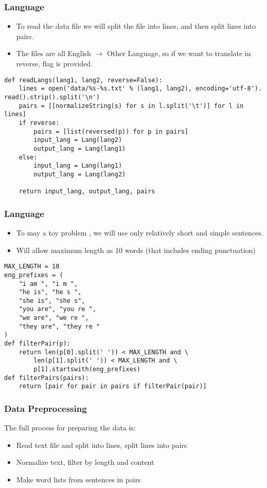 \begin{frame}[fragile]
\frametitle{ Language}
\begin{itemize}
\item To read the data file we will split the file into lines, and then split lines into pairs. 
\item The files are all English $\rightarrow$ Other Language, so if we want to translate in reverse, flag is provided.
\end{itemize}
\begin{lstlisting}    
def readLangs(lang1, lang2, reverse=False):
    lines = open('data/%s-%s.txt' % (lang1, lang2), encoding='utf-8'). read().strip().split('\n')
    pairs = [[normalizeString(s) for s in l.split('\t')] for l in lines]
    if reverse:
        pairs = [list(reversed(p)) for p in pairs]
        input_lang = Lang(lang2)
        output_lang = Lang(lang1)
    else:
        input_lang = Lang(lang1)
        output_lang = Lang(lang2)

    return input_lang, output_lang, pairs
\end{lstlisting}         
\end{frame} 

\begin{frame}[fragile]
\frametitle{ Language}
\begin{itemize}
\item To may a toy problem , we will use only relatively short and simple sentences. 
\item Will allow maximum length as 10 words (that includes ending punctuation) 
\end{itemize}
\begin{lstlisting}    
MAX_LENGTH = 10
eng_prefixes = (
    "i am ", "i m ",
    "he is", "he s ",
    "she is", "she s",
    "you are", "you re ",
    "we are", "we re ",
    "they are", "they re "
)
def filterPair(p):
    return len(p[0].split(' ')) < MAX_LENGTH and \
        len(p[1].split(' ')) < MAX_LENGTH and \
        p[1].startswith(eng_prefixes)
def filterPairs(pairs):
    return [pair for pair in pairs if filterPair(pair)]
\end{lstlisting}         
\end{frame} 

\begin{frame}[fragile]
\frametitle{ Data Preprocessing}
The full process for preparing the data is:
\begin{itemize}
\item Read text file and split into lines, split lines into pairs
\item Normalize text, filter by length and content
\item Make word lists from sentences in pairs
\end{itemize}
      
\end{frame} 

